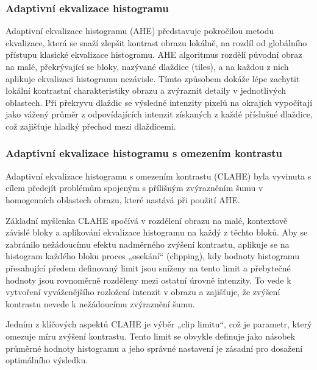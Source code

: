 \documentclass[male,czech,api_ing]{thesis}
\begin{document}
\subsubsection{Adaptivní ekvalizace histogramu}
Adaptivní ekvalizace histogramu (AHE) představuje pokročilou metodu ekvalizace, která se snaží zlepšit kontrast obrazu lokálně, na rozdíl od globálního přístupu klasické ekvalizace histogramu. AHE algoritmus rozdělí původní obraz na malé, překrývající se bloky, nazývané dlaždice (tiles), a na každou z nich aplikuje ekvalizaci histogramu nezávisle. Tímto způsobem dokáže lépe zachytit lokální kontrastní charakteristiky obrazu a zvýraznit detaily v jednotlivých oblastech. Při překryvu dlaždic se výsledné intenzity pixelů na okrajích vypočítají jako vážený průměr z odpovídajících intenzit získaných z každé příslušné dlaždice, což zajišťuje hladký přechod mezi dlaždicemi. \cite{GraphicsGems}

\subsubsection{Adaptivní ekvalizace histogramu s omezením kontrastu}
Adaptivní ekvalizace histogramu s omezením kontrastu (CLAHE) byla vyvinuta s cílem předejít problémům spojeným s přílišným zvýrazněním šumu v homogenních oblastech obrazu, které nastává při použití AHE.

Základní myšlenka CLAHE spočívá v rozdělení obrazu na malé, kontextově závislé bloky a aplikování ekvalizace histogramu na každý z těchto bloků. Aby se zabránilo nežádoucímu efektu nadměrného zvýšení kontrastu, aplikuje se na histogram každého bloku proces „osekání“ (clipping), kdy hodnoty histogramu přesahující předem definovaný limit jsou sníženy na tento limit a přebytečné hodnoty jsou rovnoměrně rozděleny mezi ostatní úrovně intenzity. To vede k vytvoření vyváženějšího rozložení intenzit v obrazu a zajišťuje, že zvýšení kontrastu nevede k nežádoucímu zvýraznění šumu. 

Jedním z klíčových aspektů CLAHE je výběr „clip limitu“, což je parametr, který omezuje míru zvýšení kontrastu. Tento limit se obvykle definuje jako násobek průměrné hodnoty histogramu a jeho správné nastavení je zásadní pro dosažení optimálního výsledku. \cite{GraphicsGems}
\end{document}
